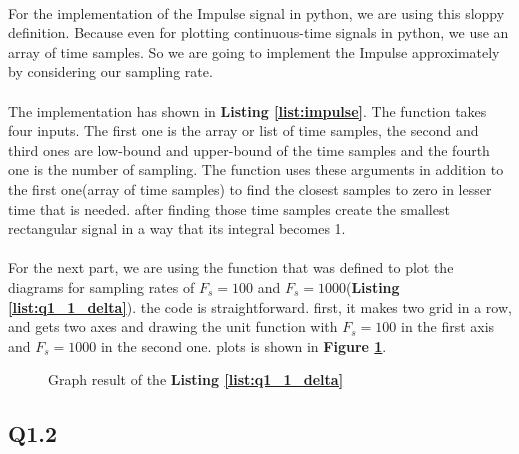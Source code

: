 \paragraph{}For the implementation of the Impulse signal in python, 
we are using this sloppy definition. Because even for 
plotting continuous-time signals in python, we use 
an array of time samples. So we are going to implement 
the Impulse approximately by considering our sampling rate.

\paragraph{}The implementation has shown in 
\textbf{Listing \ref{list:impulse}}. The function takes four inputs. 
The first one is the array or list of time samples, 
the second and third ones are low-bound and upper-bound 
of the time samples and the fourth one is the number of 
sampling. The function uses these arguments in addition 
to the first one(array of time samples) to find the 
closest samples to zero in lesser time that is needed. 
after finding those time samples create the smallest 
rectangular signal in a way that its integral becomes 1.


\paragraph{}For the next part, we are using the function that was defined to 
plot the diagrams for sampling rates of  $F_s=100$ and 
$F_s=1000$(\textbf{Listing \ref{list:q1_1_delta}}). the code is 
straightforward. first, it makes two grid in a row, and gets 
two axes and drawing the unit function with $F_s=100$ in the 
first axis and $F_s=1000$ in the second one. plots is shown in \textbf{Figure \ref{fig:Q1-1-impulse}}.
\begin{figure}[H]
  \scalebox{0.6}{}
  \caption{Graph result of the \textbf{Listing \ref{list:q1_1_delta}}}
  \label{fig:Q1-1-impulse}
\end{figure}
\subsection{Q1.2}